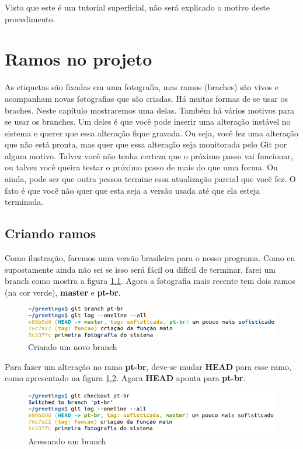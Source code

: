 \documentclass[a4paper]{book}
\begin{document}
Visto que este é um tutorial superficial, não será explicado o motivo deste procedimento.

\chapter{Ramos no projeto}

As etiquetas são fixadas em uma fotografia, mas ramos
(braches) são vivos e acompanham novas fotografias que 
são criadas.
Há muitas formas de se usar os braches.
Neste capítulo mostraremos uma delas.
Também há vários motivos para se usar os branches.
Um deles é que você pode inserir uma alteração instável
no sistema e querer que essa alteração fique gravada.
Ou seja, você fez uma alteração que não está pronta,
mas quer que essa alteração seja monitorada pelo Git por
algum motivo.
Talvez você não tenha certeza que o próximo passo vai funcionar,
ou talvez você queira testar o próximo passo de mais do que uma
forma. Ou ainda, pode ser que outra pessoa termine essa 
atualização parcial que você fez.
O fato é que você não quer que esta seja a versão usada até 
que ela esteja terminada.

\section{Criando ramos}

Como ilustração, faremos uma versão brasileira para o nosso
programa. Como eu supostamente ainda não sei se isso será
fácil ou difícil de terminar, farei um branch como mostra a
figura \ref{fig:30}.
Agora a fotografia mais recente tem dois ramos (na cor verde),
\textbf{master} e \textbf{pt-br}.

\begin{figure}[ht]
\caption{Criando um novo branch}
\label{fig:30}
\centering
\includegraphics[scale=0.6]{"images/30-Criando um novo branch.png"}
\end{figure}

Para fazer um alteração no ramo \textbf{pt-br}, deve-se mudar 
\textbf{HEAD} para esse ramo, como apresentado na figura
\ref{fig:31}. Agora \textbf{HEAD} aponta para \textbf{pt-br}.

\begin{figure}[ht]
\caption{Acessando um branch}
\label{fig:31}
\centering
\includegraphics[scale=0.6]{"images/31-Acessando um branch.png"}
\end{figure}
\end{document}
